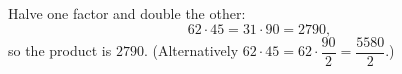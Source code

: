 Halve one factor and double the other:
\[62\cdot45=31\cdot90=2790,\]
so the product is $\boxed{2790}$. (Alternatively $62\cdot45=62\cdot\dfrac{90}{2}=\dfrac{5580}{2}$.)
